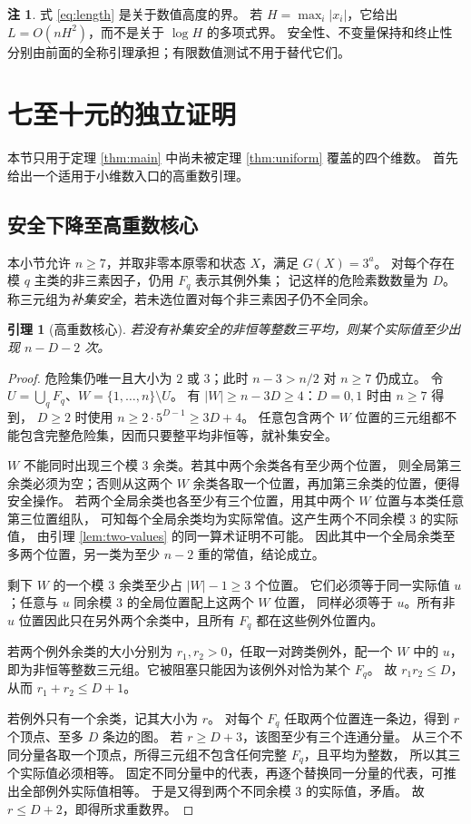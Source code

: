 \documentclass[UTF8,fontset=fandol,zihao=-4,a4paper]{ctexart}
\numberwithin{equation}{section}
\newtheorem{lemma}[theorem]{引理}
\theoremstyle{definition}
\newtheorem{remark}[theorem]{注}
\begin{document}
\begin{remark}
式 \eqref{eq:length} 是关于数值高度的界。
若 $H=\max_i|x_i|$，它给出 $L=O(nH^2)$，而不是关于 $\log H$ 的多项式界。
安全性、不变量保持和终止性分别由前面的全称引理承担；有限数值测试不用于替代它们。
\end{remark}

\section{七至十元的独立证明}\label{sec:small}

本节只用于定理 \ref{thm:main} 中尚未被定理 \ref{thm:uniform} 覆盖的四个维数。
首先给出一个适用于小维数入口的高重数引理。

\subsection{安全下降至高重数核心}

本小节允许 $n\ge7$，并取非零本原零和状态 $X$，满足 $G(X)=3^a$。
对每个存在模 $q$ 主类的非三素因子，仍用 $F_q$ 表示其例外集；
记这样的危险素数数量为 $D$。
称三元组为\emph{补集安全}，若未选位置对每个非三素因子仍不全同余。

\begin{lemma}[高重数核心]\label{lem:core}
若没有补集安全的非恒等整数三平均，则某个实际值至少出现 $n-D-2$ 次。
\end{lemma}
\begin{proof}
危险集仍唯一且大小为 $2$ 或 $3$；此时 $n-3>n/2$ 对 $n\ge7$ 仍成立。
令 $U=\bigcup_qF_q$、$W=\{1,\ldots,n\}\setminus U$。
有 $|W|\ge n-3D\ge4$：$D=0,1$ 时由 $n\ge7$ 得到，
$D\ge2$ 时使用 $n\ge2\cdot5^{D-1}\ge3D+4$。
任意包含两个 $W$ 位置的三元组都不能包含完整危险集，因而只要整平均非恒等，就补集安全。

$W$ 不能同时出现三个模 $3$ 余类。若其中两个余类各有至少两个位置，
则全局第三余类必须为空；否则从这两个 $W$ 余类各取一个位置，再加第三余类的位置，便得安全操作。
若两个全局余类也各至少有三个位置，用其中两个 $W$ 位置与本类任意第三位置组队，
可知每个全局余类均为实际常值。这产生两个不同余模 $3$ 的实际值，
由引理 \ref{lem:two-values} 的同一算术证明不可能。
因此其中一个全局余类至多两个位置，另一类为至少 $n-2$ 重的常值，结论成立。

剩下 $W$ 的一个模 $3$ 余类至少占 $|W|-1\ge3$ 个位置。
它们必须等于同一实际值 $u$；任意与 $u$ 同余模 $3$ 的全局位置配上这两个 $W$ 位置，
同样必须等于 $u$。所有非 $u$ 位置因此只在另外两个余类中，且所有 $F_q$ 都在这些例外位置内。

若两个例外余类的大小分别为 $r_1,r_2>0$，任取一对跨类例外，配一个 $W$ 中的 $u$，
即为非恒等整数三元组。它被阻塞只能因为该例外对恰为某个 $F_q$。
故 $r_1r_2\le D$，从而 $r_1+r_2\le D+1$。

若例外只有一个余类，记其大小为 $r$。
对每个 $F_q$ 任取两个位置连一条边，得到 $r$ 个顶点、至多 $D$ 条边的图。
若 $r\ge D+3$，该图至少有三个连通分量。
从三个不同分量各取一个顶点，所得三元组不包含任何完整 $F_q$，且平均为整数，
所以其三个实际值必须相等。
固定不同分量中的代表，再逐个替换同一分量的代表，可推出全部例外实际值相等。
于是又得到两个不同余模 $3$ 的实际值，矛盾。
故 $r\le D+2$，即得所求重数界。
\end{proof}
\end{document}
